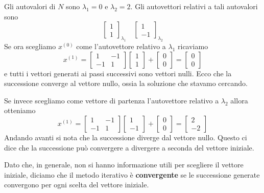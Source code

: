 Gli autovalori di $N$ sono $\lambda_1 = 0$ e $\lambda_2 = 2$. Gli autovettori relativi a tali autovalori sono
\[ \begin{bmatrix} 1 \\ 1 \end{bmatrix}_{\lambda_1} \quad \begin{bmatrix} 1 \\ -1 \end{bmatrix}_{\lambda_2} \]
Se ora scegliamo $x^{(0)}$ come l'autovettore relativo a $\lambda_1$ ricaviamo
\[
	x^{(1)} = \begin{bmatrix}
		1  & -1 \\
		-1 & 1
	\end{bmatrix}
	\begin{bmatrix} 1 \\ 1 \end{bmatrix} +
	\begin{bmatrix} 0 \\ 0 \end{bmatrix} =
	\begin{bmatrix} 0 \\ 0 \end{bmatrix}
\]
e tutti i vettori generati ai passi successivi sono vettori nulli. Ecco che la successione converge al vettore
nullo, ossia la soluzione che stavamo cercando.

Se invece scegliamo come vettore di partenza l'autovettore relativo a $\lambda_2$ allora otteniamo
\[
	x^{(1)} = \begin{bmatrix}
		1  & -1 \\
		-1 & 1
	\end{bmatrix}
	\begin{bmatrix} 1 \\ -1 \end{bmatrix} +
	\begin{bmatrix} 0 \\ 0 \end{bmatrix} =
	\begin{bmatrix} 2 \\ -2 \end{bmatrix}
\]
Andando avanti si nota che la successione diverge dal vettore nullo. Questo ci dice che la successione può
convergere a divergere a seconda del vettore iniziale.

\begin{definition}
	Dato che, in generale, non si hanno informazione utili per scegliere il vettore iniziale, diciamo che il
	metodo iterativo è \textbf{convergente} se le successione generate convergono per ogni scelta del vettore
	iniziale.
\end{definition}

